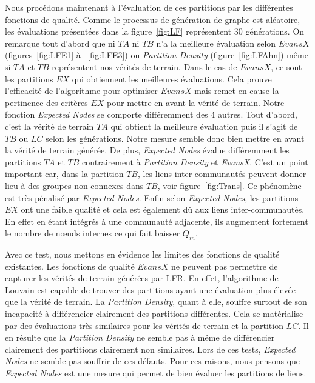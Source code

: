 Nous procédons maintenant à l'évaluation de ces partitions par les différentes fonctions de qualité.
Comme le processus de génération de graphe est aléatoire, les évaluations présentées dans la figure~\ref{fig:LF} représentent $30$ générations.
On remarque tout d'abord que ni $TA$ ni $TB$ n'a la meilleure évaluation selon $EvansX$ (figures~\ref{fig:LFE1} à ~\ref{fig:LFE3}) ou \emph{Partition Density} (figure~\ref{fig:LFAhn}) même si $TA$ et $TB$ représentent nos vérités de terrain.
Dans le cas de $EvansX$, ce sont les partitions $EX$ qui obtiennent les meilleures évaluations.
Cela prouve l'efficacité de l'algorithme pour optimiser $EvansX$ mais remet en cause la pertinence des critères $EX$ pour mettre en avant la vérité de terrain.
Notre fonction \emph{Expected Nodes} se comporte différemment des 4 autres.
Tout d'abord, c'est la vérité de terrain $TA$ qui obtient la meilleure évaluation puis il s'agit de $TB$ ou $LC$ selon les générations.
Notre mesure semble donc bien mettre en avant la vérité de terrain générée.
De plus, \emph{Expected Nodes} évalue différemment les partitions $TA$ et $TB$ contrairement à \emph{Partition Density} et \emph{EvansX}.
C'est un point important car, dans la partition $TB$, les liens inter-communautés peuvent donner lieu à des groupes non-connexes dans $TB$, voir figure~\ref{fig:Trans}.
Ce phénomène est très pénalisé par \emph{Expected Nodes}.
Enfin selon \emph{Expected Nodes}, les partitions $EX$ ont une faible qualité et cela est également dû aux liens inter-communautés.
En effet en étant intégrés à une communauté adjacente, ils augmentent fortement le nombre de n\oe{}uds internes ce qui fait baisser $Q_{in}$.

Avec ce test, nous mettons en évidence les limites des fonctions de qualité existantes.
Les fonctions de qualité $EvansX$ ne peuvent pas permettre de capturer les vérités de terrain générées par LFR.
En effet, l'algorithme de Louvain est capable de trouver des partitions ayant une évaluation plus élevée que la vérité de terrain.
La \emph{Partition Density}, quant à elle, souffre surtout de son incapacité à différencier clairement des partitions différentes.
Cela se matérialise par des évaluations très similaires pour les vérités de terrain et la partition $LC$.
Il en résulte que la \emph{Partition Density} ne semble pas à même de différencier clairement des partitions  clairement non similaires.
Lors de ces tests, \emph{Expected Nodes} ne semble pas souffrir de ces défauts.
Pour ces raisons, nous pensons que \emph{Expected Nodes} est une mesure qui permet de bien évaluer les partitions de liens.

